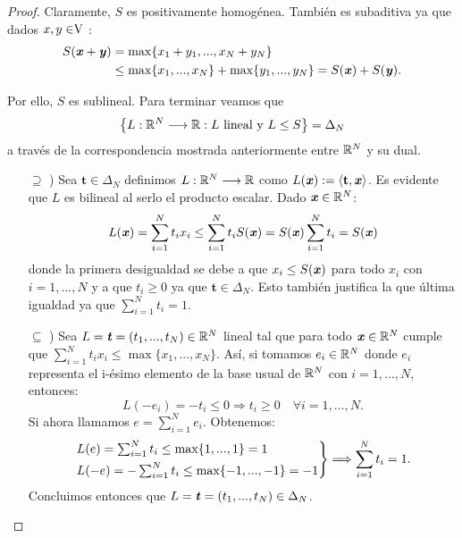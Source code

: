 	\begin{proof}
		Claramente, $ S $ es positivamente homogénea. También es subaditiva ya que dados $ x,y \in \vecSpace $ : 
		\begin{equation*}
		\begin{split}
		S(\textbf{\emph{x}}+\textbf{\emph{y}}) &= \max \{x_1 + y_1, ..., x_N +y_N \}\\ 
		&\leq \max\{x_1, ..., x_N\} + \max \{y_1, ...,y_N\} = S(\textbf{\emph{x}}) + S(\textbf{\emph{y}}).
		\end{split}
		\end{equation*}
		
		Por ello, $ S $ es sublineal. Para terminar veamos que  \[\left\lbrace L:\mathbb{R}^N \longrightarrow \mathbb{R} : L \text{ lineal y }L\leq S \right\rbrace  =  \Delta_N \]
		 a través de la correspondencia mostrada anteriormente entre $ \mathbb{R}^N $ y su dual.
		
		\begin{itemize}
			\item[$ \supseteq $ )] Sea $ \mathbf{t} \in \Delta_N$ definimos $ L:\mathbb{R}^N \longrightarrow \mathbb{R} $ como $ L(\textbf{\emph{x}}):= \langle \mathbf{t},\textbf{\emph{x}} \rangle $. Es evidente que $ L $ es bilineal al serlo el producto escalar. Dado $ \textbf{\emph{x}} \in \mathbb{R}^N $:
			\begin{equation*}
				L(\textbf{\emph{x}}) = \sum_{i=1}^{N}{t_i x_i} \leq \sum_{i=1}^{N}{t_i S(\textbf{\emph{x}})} = S(\textbf{\emph{x}})\sum_{i=1}^{N}{t_i} = S(\textbf{\emph{x}})
			\end{equation*}
			donde la primera desigualdad se debe a que $ x_i \leq S(\textbf{\emph{x}})$ para todo $ x_i$ con $ i=1,...,N $ y a que $ t_i \geq 0 $ ya que $ \mathbf{t} \in \Delta_N$. Esto también justifica la que última igualdad ya que $ \sum_{i=1}^{N}{t_i} = 1 $.
			
			\item[$ \subseteq $ )] Sea $ L = \textbf{\emph{t}} = (t_1,...,t_N) \in \mathbb{R}^N $ lineal tal que para todo $ \textbf{\emph{x}} \in \mathbb{R}^N $ cumple que $ \sum_{i=1}^{N}{t_i x_i} \leq \max\{x_1,...,x_N\}$. Así, si tomamos $ e_i \in \mathbb{R}^N $ donde $ e_i $ representa el i-ésimo elemento de la base usual de $ \mathbb{R}^N $ con $ i=1,...,N $, entonces:   		
			\begin{equation*}
				L(-e_i) = -t_i \leq 0 \Longrightarrow t_i \geq 0 \quad \forall i=1,...,N.
			\end{equation*}
			Si ahora llamamos $ e = \sum_{i=1}^{N}{e_i} $. Obtenemos:
			\begin{equation*}
				\begin{rcases*}
				L(e) = \sum_{i=1}^{N}{t_i} \leq \max \{1, ...,1\} = 1 \\
				L(-e) = -\sum_{i=1}^{N}{t_i} \leq \max \{-1, ...,-1\} = -1
				\end{rcases*} \Longrightarrow \sum_{i=1}^{N}{t_i} = 1.
			\end{equation*}
			Concluimos entonces que $ L = \textbf{\emph{t}} = (t_1,...,t_N) \in \Delta_N $.
		\end{itemize}
		
	\end{proof}

